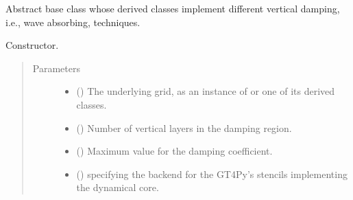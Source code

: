 \documentclass[letterpaper,10pt,english]{sphinxmanual}
\begin{document}
\begin{fulllineitems}
\label{\detokenize{api:dycore.vertical_damping.VerticalDamping}}
Abstract base class whose derived classes implement different vertical damping, i.e., wave absorbing, techniques.

\begin{fulllineitems}
\label{\detokenize{api:dycore.vertical_damping.VerticalDamping.__init__}}
Constructor.
\begin{quote}\begin{description}
\item[{Parameters}] \leavevmode\begin{itemize}
\item {} 
 () \textendash{} The underlying grid, as an instance of {\hyperref[\detokenize{api:grids.grid_xyz.GridXYZ}]{}} or one of its derived classes.

\item {} 
 () \textendash{} Number of vertical layers in the damping region.

\item {} 
 () \textendash{} Maximum value for the damping coefficient.

\item {} 
 () \textendash{}  specifying the backend for the GT4Py’s stencils implementing the dynamical core.

\end{itemize}

\end{description}\end{quote}

\end{fulllineitems}



\end{fulllineitems}
\end{document}
